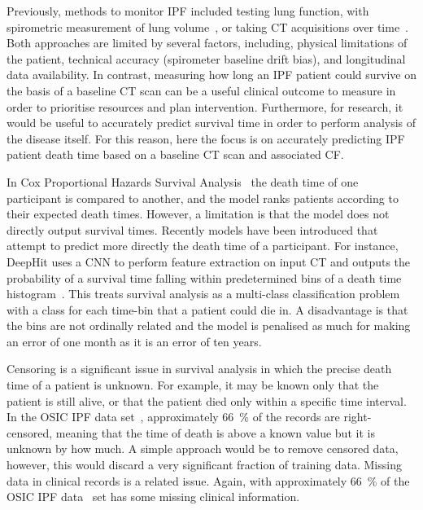         Previously, methods to monitor \gls{IPF} included testing lung function, with spirometric measurement of lung volume~\parencite{Watters1986AFibrosis}, or taking \gls{CT} acquisitions over time~\parencite{Lynch2018DiagnosticPaper}. Both approaches are limited by several factors, including, physical limitations of the patient, technical accuracy (spirometer baseline drift bias), and  longitudinal data availability. In contrast, measuring how long an \gls{IPF} patient could survive on the basis of a baseline \gls{CT} scan can be a useful clinical outcome to measure in order to prioritise resources and plan intervention. Furthermore, for research, it would be useful to accurately predict survival time in order to perform analysis of the disease itself. For this reason, here the focus is on accurately predicting \gls{IPF} patient death time based on a baseline \gls{CT} scan and associated \gls{CF}.
    
        In Cox Proportional Hazards Survival Analysis~\parencite{Cox1972RegressionLife-Tables} the death time of one participant is compared to another, and the model ranks patients according to their expected death times. However, a limitation is that the model does not directly output survival times. Recently models have been introduced that attempt to predict more directly the death time of a participant. For instance, DeepHit uses a \gls{CNN} to perform feature extraction on input \gls{CT} and outputs the probability of a survival time falling within predetermined bins of a death time histogram~\parencite{Lee2018DeepHit:Risks}. This treats survival analysis as a multi-class classification problem with a class for each time-bin that a patient could die in. A disadvantage is that the bins are not ordinally related and the model is penalised as much for making an error of one month as it is an error of ten years.
    
        Censoring is a significant issue in survival analysis in which the precise death time of a patient is unknown. For example, it may be known only that the patient is still alive, or that the patient died only within a specific time interval. In the \gls{OSIC} \gls{IPF} data set~\parencite{OSICOSICRepository}, approximately \SI{66}{\percent} of the records are right-censored, meaning that the time of death is above a known value but it is unknown by how much. A simple approach would be to remove censored data, however, this would discard a very significant fraction of training data. Missing data in clinical records is a related issue. Again, with approximately \SI{66}{\percent} of the \gls{OSIC} \gls{IPF} data~\parencite{OSICOSICRepository} set has some missing clinical information.
    
